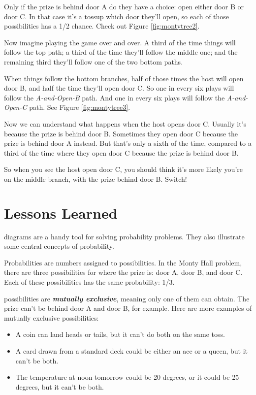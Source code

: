 \documentclass[justified]{tufte-book}
\providecommand{\tightlist}{%
  \setlength{\itemsep}{0pt}\setlength{\parskip}{0pt}}
\begin{document}
Only if the prize is behind door A do they have a choice: open either door B or door C. In that case it's a tossup which door they'll open, so each of those possibilities has a 1/2 chance. Check out Figure \ref{fig:montytree2}.

Now imagine playing the game over and over. A third of the time things will follow the top path; a third of the time they'll follow the middle one; and the remaining third they'll follow one of the two bottom paths.

When things follow the bottom branches, half of those times the host will open door B, and half the time they'll open door C. So one in every six plays will follow the \emph{A-and-Open-B} path. And one in every six plays will follow the \emph{A-and-Open-C} path. See Figure \ref{fig:montytree3}.

Now we can understand what happens when the host opens door C. Usually it's because the prize is behind door B. Sometimes they open door C because the prize is behind door A instead. But that's only a sixth of the time, compared to a third of the time where they open door C because the prize is behind door B.

So when you see the host open door C, you should think it's more likely you're on the middle branch, with the prize behind door B. Switch!

\hypertarget{lessons}{%
\section{Lessons Learned}\label{lessons}}

 diagrams are a handy tool for solving probability problems. They also illustrate some central concepts of probability.

Probabilities are numbers assigned to possibilities. In the Monty Hall problem, there are three possibilities for where the prize is: door A, door B, and door C. Each of these possibilities has the same probability: 1/3.

 possibilities are \textbf{\emph{mutually exclusive}}, meaning only one of them can obtain. The prize can't be behind door A and door B, for example. Here are more examples of mutually exclusive possibilities:

\begin{itemize}
\tightlist
\item
  A coin can land heads or tails, but it can't do both on the same toss.
\item
  A card drawn from a standard deck could be either an ace or a queen, but it can't be both.
\item
  The temperature at noon tomorrow could be 20 degrees, or it could be 25 degrees, but it can't be both.
\end{itemize}
\end{document}
